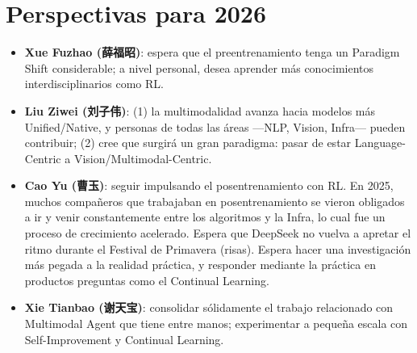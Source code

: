 \section{Perspectivas para 2026}

\begin{itemize}
  \item \textbf{Xue Fuzhao (薛福昭)}: espera que el preentrenamiento tenga un Paradigm Shift considerable; a nivel personal, desea aprender más conocimientos interdisciplinarios como RL.
  \item \textbf{Liu Ziwei (刘子伟)}: (1) la multimodalidad avanza hacia modelos más Unified/Native, y personas de todas las áreas —NLP, Vision, Infra— pueden contribuir; (2) cree que surgirá un gran paradigma: pasar de estar Language-Centric a Vision/Multimodal-Centric.
  \item \textbf{Cao Yu (曹玉)}: seguir impulsando el posentrenamiento con RL. En 2025, muchos compañeros que trabajaban en posentrenamiento se vieron obligados a ir y venir constantemente entre los algoritmos y la Infra, lo cual fue un proceso de crecimiento acelerado. Espera que DeepSeek no vuelva a apretar el ritmo durante el Festival de Primavera (risas). Espera hacer una investigación más pegada a la realidad práctica, y responder mediante la práctica en productos preguntas como el Continual Learning.
  \item \textbf{Xie Tianbao (谢天宝)}: consolidar sólidamente el trabajo relacionado con Multimodal Agent que tiene entre manos; experimentar a pequeña escala con Self-Improvement y Continual Learning.
\end{itemize}

